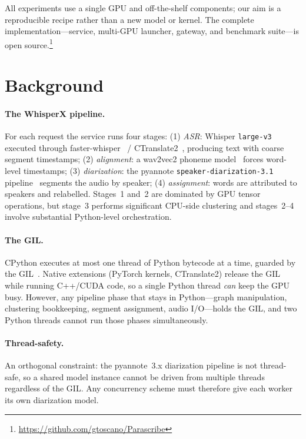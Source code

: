 \documentclass[10pt]{article}
\begin{document}
All experiments use a single GPU and off-the-shelf components; our aim is a
reproducible recipe rather than a new model or kernel. The complete
implementation---service, multi-GPU launcher, gateway, and benchmark suite---is
open source.\footnote{\url{https://github.com/gtoscano/Parascribe}}

\section{Background}
\label{sec:background}

\paragraph{The WhisperX pipeline.}
For each request the service runs four stages:
(1) \emph{ASR}: Whisper \texttt{large-v3}~\cite{radford2023whisper} executed
through faster-whisper~\cite{fasterwhisper} / CTranslate2~\cite{ctranslate2},
producing text with coarse segment timestamps;
(2) \emph{alignment}: a wav2vec2 phoneme model~\cite{baevski2020wav2vec2} forces
word-level timestamps;
(3) \emph{diarization}: the pyannote \texttt{speaker-diarization-3.1}
pipeline~\cite{bredin2020pyannote,bredin2023pyannote,plaquet2023powerset}
segments the audio by speaker;
(4) \emph{assignment}: words are attributed to speakers and relabelled.
Stages~1 and~2 are dominated by GPU tensor operations, but stage~3 performs
significant CPU-side clustering and stages~2--4 involve substantial Python-level
orchestration.

\paragraph{The GIL.}
CPython executes at most one thread of Python bytecode at a time, guarded by the
GIL~\cite{cpythongil}. Native extensions (PyTorch kernels, CTranslate2) release
the GIL while running C++/CUDA code, so a single Python thread \emph{can} keep
the GPU busy. However, any pipeline phase that stays in Python---graph
manipulation, clustering bookkeeping, segment assignment, audio I/O---holds the
GIL, and two Python threads cannot run those phases simultaneously.

\paragraph{Thread-safety.}
An orthogonal constraint: the pyannote~3.x diarization pipeline is not
thread-safe, so a shared model instance cannot be driven from multiple threads
regardless of the GIL. Any concurrency scheme must therefore give each worker
its own diarization model.
\end{document}
